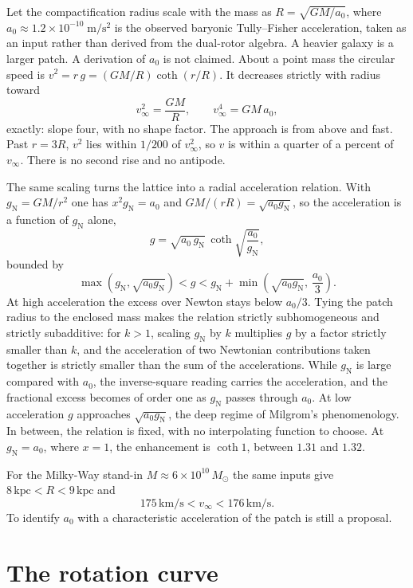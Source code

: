 \documentclass[a4paper]{article}
\begin{document}
Let the compactification radius scale with the mass as $R=\sqrt{GM/a_0}$, where $a_0 \approx 1.2 \times 10^{-10}\;\mathrm{m/s^2}$ is the observed baryonic Tully--Fisher acceleration, taken as an input rather than derived from the dual-rotor algebra. A heavier galaxy is a larger patch. A derivation of $a_0$ is not claimed. About a point mass the circular speed is $v^2=r\,g=(GM/R)\coth(r/R)$. It decreases strictly with radius toward
\[
v_\infty^2=\frac{GM}{R}, \qquad v_\infty^4=GM\,a_0,
\]
exactly: slope four, with no shape factor. The approach is from above and fast. Past $r=3R$, $v^2$ lies within $1/200$ of $v_\infty^2$, so $v$ is within a quarter of a percent of $v_\infty$. There is no second rise and no antipode.

The same scaling turns the lattice into a radial acceleration relation. With $g_{\text{N}}=GM/r^2$ one has $x^2g_{\text{N}}=a_0$ and $GM/(rR)=\sqrt{a_0g_{\text{N}}}$, so the acceleration is a function of $g_{\text{N}}$ alone,
\begin{equation}
\label{eq:dual-rar}
g=\sqrt{a_0\,g_{\text{N}}}\,\coth\sqrt{\frac{a_0}{g_{\text{N}}}},
\end{equation}
bounded by
\[
\max\!\left(g_{\text{N}},\sqrt{a_0g_{\text{N}}}\right)<g<g_{\text{N}}+\min\!\left(\sqrt{a_0g_{\text{N}}},\,\frac{a_0}{3}\right).
\]
At high acceleration the excess over Newton stays below $a_0/3$. Tying the patch radius to the enclosed mass makes the relation strictly subhomogeneous and strictly subadditive: for $k>1$, scaling $g_{\text{N}}$ by $k$ multiplies $g$ by a factor strictly smaller than $k$, and the acceleration of two Newtonian contributions taken together is strictly smaller than the sum of the accelerations. While $g_{\text{N}}$ is large compared with $a_0$, the inverse-square reading carries the acceleration, and the fractional excess becomes of order one as $g_{\text{N}}$ passes through $a_0$. At low acceleration $g$ approaches $\sqrt{a_0g_{\text{N}}}$, the deep regime of Milgrom's phenomenology. In between, the relation is fixed, with no interpolating function to choose. At $g_{\text{N}}=a_0$, where $x=1$, the enhancement is $\coth 1$, between $1.31$ and $1.32$.

For the Milky-Way stand-in $M \approx 6 \times 10^{10}\,M_\odot$ the same inputs give $8\,\mathrm{kpc}<R<9\,\mathrm{kpc}$ and
\[
175\,\mathrm{km/s}<v_\infty<176\,\mathrm{km/s}.
\]
To identify $a_0$ with a characteristic acceleration of the patch is still a proposal.

\section{The rotation curve}
\label{sec:rotation}
\end{document}
